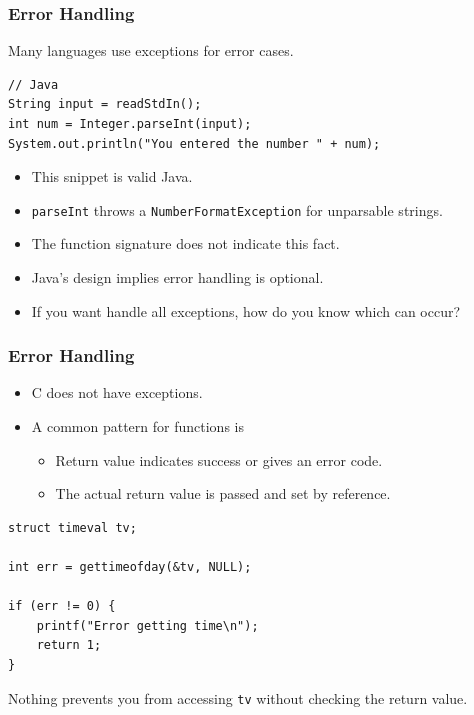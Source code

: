 \begin{frame}[fragile]
    \frametitle{Error Handling}
    Many languages use exceptions for error cases.
    \pause
    \vfill
    \begin{verbatim}
// Java
String input = readStdIn();
int num = Integer.parseInt(input);
System.out.println("You entered the number " + num);
    \end{verbatim}
    \pause
    \vfill
    \begin{itemize}
        \item This snippet is valid Java.
        \pause
        \item \texttt{parseInt} throws a \texttt{NumberFormatException} for unparsable strings.
        \item The function signature does not indicate this fact.
        \pause
        \item Java's design implies error handling is optional.
        \item If you want handle all exceptions, how do you know which can occur?
    \end{itemize}
\end{frame}

\begin{frame}[fragile]
    \frametitle{Error Handling}
    \begin{itemize}
        \item C does not have exceptions.
        \item A common pattern for functions is
        \begin{itemize}
            \item Return value indicates success or gives an error code.
            \item The actual return value is passed and set by reference.
        \end{itemize}
    \end{itemize}
    \pause
    \vfill
    \begin{verbatim}
struct timeval tv;

int err = gettimeofday(&tv, NULL);

if (err != 0) {
    printf("Error getting time\n");
    return 1;
}
    \end{verbatim}
    \pause
    \vfill
    Nothing prevents you from accessing \texttt{tv} without checking the return value.
\end{frame}


